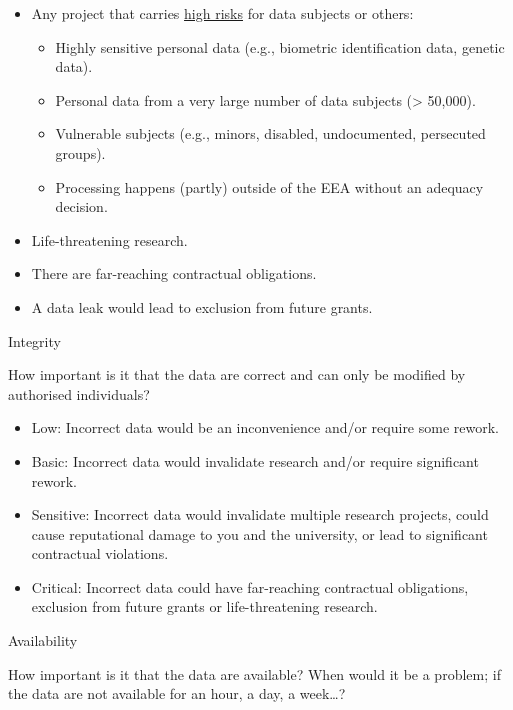 \documentclass[
]{book}
\providecommand{\tightlist}{%
  \setlength{\itemsep}{0pt}\setlength{\parskip}{0pt}}
\begin{document}
\begin{itemize}
  \begin{itemize}
  \tightlist
  \item
    Any project that carries \protect\hyperlink{high-risk-processing}{high risks} for data
    subjects or others:

    \begin{itemize}
    \tightlist
    \item
      Highly sensitive personal data (e.g., biometric identification data,
      genetic data).
    \item
      Personal data from a very large number of data subjects (\textgreater{} 50,000).
    \item
      Vulnerable subjects (e.g., minors, disabled, undocumented, persecuted groups).
    \item
      Processing happens (partly) outside of the EEA without an adequacy decision.
    \end{itemize}
  \item
    Life-threatening research.
  \item
    There are far-reaching contractual obligations.
  \item
    A data leak would lead to exclusion from future grants.
  \end{itemize}
\end{itemize}

Integrity

How important is it that the data are correct and can only be modified by
authorised individuals?

\begin{itemize}
\tightlist
\item
  Low: Incorrect data would be an inconvenience and/or require some rework.
\item
  Basic: Incorrect data would invalidate research and/or require significant
  rework.
\item
  Sensitive: Incorrect data would invalidate multiple research projects, could
  cause reputational damage to you and the university, or lead to significant
  contractual violations.
\item
  Critical: Incorrect data could have far-reaching contractual obligations,
  exclusion from future grants or life-threatening research.
\end{itemize}

Availability

How important is it that the data are available? When would it be a problem; if
the data are not available for an hour, a day, a week\ldots?
\end{document}
